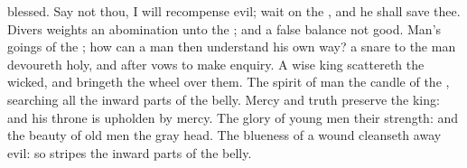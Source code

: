{blessed.
Say not thou, I will
recompense
evil;
{} wait
on the
{}, and he shall
save thee.
Divers
weights
{} an
abomination unto the
{}; and a
false
balance
{} not
good.
Man’s
goings
{} of the
{}; how can a
man then
understand his own
way?
 a
snare to the
man
{}
devoureth
{}
holy, and
after
vows to make
enquiry.
A
wise
king
scattereth the
wicked, and
bringeth the
wheel over them.
The
spirit of
man
{} the
candle of the
{},
searching all the inward
parts of the
belly.
Mercy and
truth
preserve the
king: and his
throne is
upholden by
mercy.
The
glory of young
men
{} their
strength: and the
beauty of old
men
{} the gray
head.
The
blueness of a
wound
cleanseth away
evil: so
{}
stripes the inward
parts of the
belly.

}

